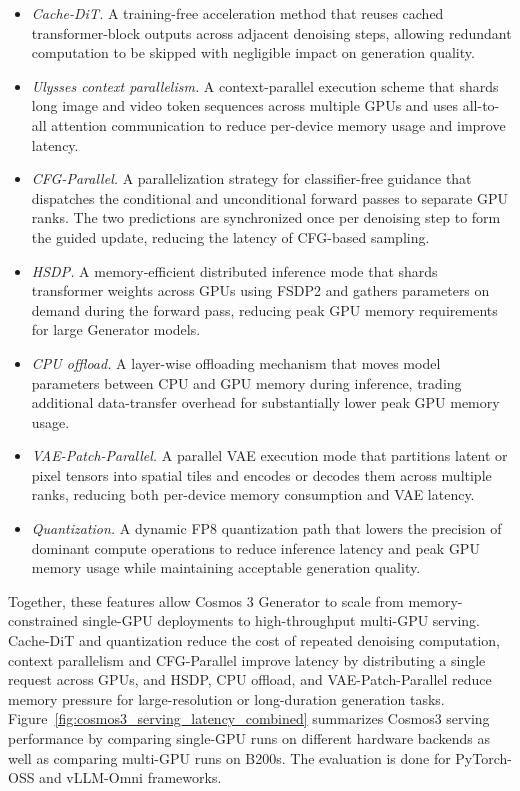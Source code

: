 \begin{itemize}

    \item \textit{Cache-DiT.} A training-free acceleration method that reuses cached transformer-block outputs across adjacent denoising steps, allowing redundant computation to be skipped with negligible impact on generation quality.

    \item \textit{Ulysses context parallelism.} A context-parallel execution scheme that shards long image and video token sequences across multiple GPUs and uses all-to-all attention communication to reduce per-device memory usage and improve latency.

    \item \textit{CFG-Parallel.} A parallelization strategy for classifier-free guidance that dispatches the conditional and unconditional forward passes to separate GPU ranks. The two predictions are synchronized once per denoising step to form the guided update, reducing the latency of CFG-based sampling.

    \item \textit{HSDP.} A memory-efficient distributed inference mode that shards transformer weights across GPUs using FSDP2 and gathers parameters on demand during the forward pass, reducing peak GPU memory requirements for large Generator models.

    \item \textit{CPU offload.} A layer-wise offloading mechanism that moves model parameters between CPU and GPU memory during inference, trading additional data-transfer overhead for substantially lower peak GPU memory usage.

    \item \textit{VAE-Patch-Parallel.} A parallel VAE execution mode that partitions latent or pixel tensors into spatial tiles and encodes or decodes them across multiple ranks, reducing both per-device memory consumption and VAE latency.

    \item \textit{Quantization.} A dynamic FP8 quantization path that lowers the precision of dominant compute operations to reduce inference latency and peak GPU memory usage while maintaining acceptable generation quality.


\end{itemize}

Together, these features allow Cosmos 3 Generator to scale from memory-constrained single-GPU deployments to high-throughput multi-GPU serving. Cache-DiT and quantization reduce the cost of repeated denoising computation, context parallelism and CFG-Parallel improve latency by distributing a single request across GPUs, and HSDP, CPU offload, and VAE-Patch-Parallel reduce memory pressure for large-resolution or long-duration generation tasks. Figure~\ref{fig:cosmos3_serving_latency_combined} summarizes Cosmos3 serving performance by comparing single-GPU runs on different hardware backends as well as comparing multi-GPU runs on B200s. The evaluation is done for PyTorch-OSS and vLLM-Omni frameworks. 
